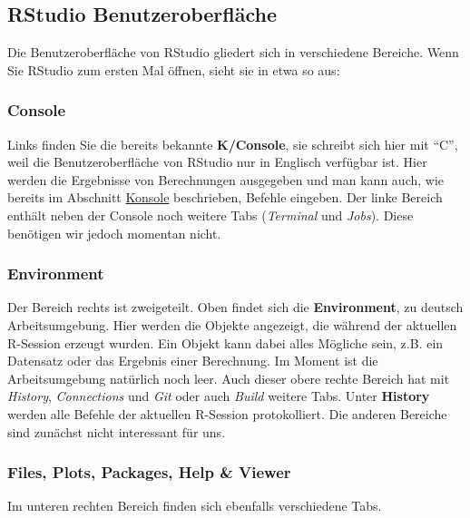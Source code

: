 \documentclass[
]{book}
\begin{document}
\hypertarget{rstudio-benutzeroberfluxe4che}{%
\subsection{RStudio Benutzeroberfläche}\label{rstudio-benutzeroberfluxe4che}}

Die Benutzeroberfläche von RStudio gliedert sich in verschiedene Bereiche.
Wenn Sie RStudio zum ersten Mal öffnen, sieht sie in etwa so aus:

\hypertarget{console}{%
\subsubsection{Console}\label{console}}

Links finden Sie die bereits bekannte \textbf{K/Console}, sie schreibt sich hier mit ``C'', weil die Benutzeroberfläche von RStudio nur in Englisch verfügbar ist. Hier werden die Ergebnisse von Berechnungen ausgegeben und man kann auch, wie bereits im Abschnitt \protect\hyperlink{konsole}{Konsole} beschrieben, Befehle eingeben. Der linke Bereich enthält neben der Console noch weitere Tabs (\emph{Terminal} und \emph{Jobs}). Diese benötigen wir jedoch momentan nicht.

\hypertarget{environment}{%
\subsubsection{Environment}\label{environment}}

Der Bereich rechts ist zweigeteilt. Oben findet sich die \textbf{Environment}, zu deutsch Arbeitsumgebung.
Hier werden die Objekte angezeigt, die während der aktuellen R-Session erzeugt wurden. Ein Objekt kann dabei alles Mögliche sein, z.B. ein Datensatz oder das Ergebnis einer Berechnung. Im Moment ist die Arbeitsumgebung natürlich noch leer. Auch dieser obere rechte Bereich hat mit \emph{History}, \emph{Connections} und \emph{Git} oder auch \emph{Build} weitere Tabs. Unter \textbf{History} werden alle Befehle der aktuellen R-Session protokolliert. Die anderen Bereiche sind zunächst nicht interessant für uns.

\hypertarget{files-plots-packages-help-viewer}{%
\subsubsection{Files, Plots, Packages, Help \& Viewer}\label{files-plots-packages-help-viewer}}

Im unteren rechten Bereich finden sich ebenfalls verschiedene Tabs.
\end{document}
